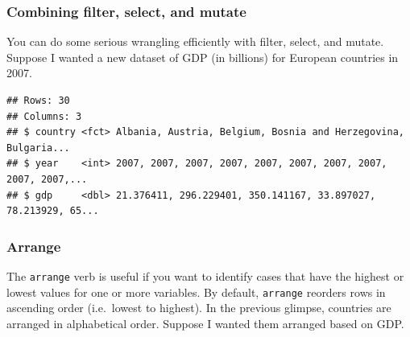 \documentclass[
]{book}
\newenvironment{Shaded}{\begin{snugshade}}{\end{snugshade}}
\newcommand{\DataTypeTok}[1]{\textcolor[rgb]{0.13,0.29,0.53}{#1}}
\newcommand{\DecValTok}[1]{\textcolor[rgb]{0.00,0.00,0.81}{#1}}
\newcommand{\KeywordTok}[1]{\textcolor[rgb]{0.13,0.29,0.53}{\textbf{#1}}}
\newcommand{\NormalTok}[1]{#1}
\newcommand{\OperatorTok}[1]{\textcolor[rgb]{0.81,0.36,0.00}{\textbf{#1}}}
\newcommand{\StringTok}[1]{\textcolor[rgb]{0.31,0.60,0.02}{#1}}
\begin{document}
\hypertarget{combining-filter-select-and-mutate}{%
\subsubsection*{Combining filter, select, and mutate}\label{combining-filter-select-and-mutate}}

You can do some serious wrangling efficiently with filter, select, and mutate. Suppose I wanted a new dataset of GDP (in billions) for European countries in 2007.

\begin{Shaded}
\end{Shaded}

\begin{verbatim}
## Rows: 30
## Columns: 3
## $ country <fct> Albania, Austria, Belgium, Bosnia and Herzegovina, Bulgaria...
## $ year    <int> 2007, 2007, 2007, 2007, 2007, 2007, 2007, 2007, 2007, 2007,...
## $ gdp     <dbl> 21.376411, 296.229401, 350.141167, 33.897027, 78.213929, 65...
\end{verbatim}

\hypertarget{arrange}{%
\subsubsection*{Arrange}\label{arrange}}

The \texttt{arrange} verb is useful if you want to identify cases that have the highest or lowest values for one or more variables. By default, \texttt{arrange} reorders rows in ascending order (i.e.~lowest to highest). In the previous glimpse, countries are arranged in alphabetical order. Suppose I wanted them arranged based on GDP.
\end{document}
